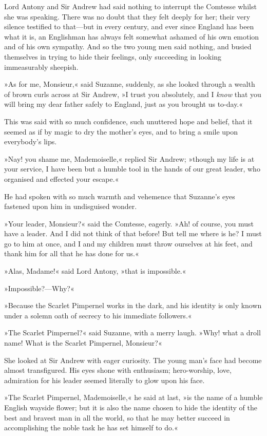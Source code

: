 Lord Antony and Sir Andrew had said nothing to interrupt the Comtesse whilst she was speaking. There was no doubt that they felt deeply for her; their very silence testified to that\allowbreak---\allowbreak but in every century, and ever since England has been what it is, an Englishman has always felt somewhat ashamed of his own emotion and of his own sympathy. And so the two young men said nothing, and busied themselves in trying to hide their feelings, only succeeding in looking immeasurably sheepish.

»As for me, Monsieur,« said Suzanne, suddenly, as she looked through a wealth of brown curls across at Sir Andrew, »I trust you absolutely, and I \textit{know} that you will bring my dear father safely to England, just as you brought us to-day.«

This was said with so much confidence, such unuttered hope and belief, that it seemed as if by magic to dry the mother's eyes, and to bring a smile upon everybody's lips.

»Nay! you shame me, Mademoiselle,« replied Sir Andrew; »though my life is at your service, I have been but a humble tool in the hands of our great leader, who organised and effected your escape.«

He had spoken with so much warmth and vehemence that Suzanne's eyes fastened upon him in undisguised wonder.

»Your leader, Monsieur?« said the Comtesse, eagerly. »Ah! of course, you must have a leader. And I did not think of that before! But tell me where is he? I must go to him at once, and I and my children must throw ourselves at his feet, and thank him for all that he has done for us.«

»Alas, Madame!« said Lord Antony, »that is impossible.«

»Impossible?\allowbreak---\allowbreak Why?«

»Because the Scarlet Pimpernel works in the dark, and his identity is only known under a solemn oath of secrecy to his immediate followers.«

»The Scarlet Pimpernel?« said Suzanne, with a merry laugh. »Why! what a droll name! What is the Scarlet Pimpernel, Monsieur?«

She looked at Sir Andrew with eager curiosity. The young man's face had become almost transfigured. His eyes shone with enthusiasm; hero-worship, love, admiration for his leader seemed literally to glow upon his face.

»The Scarlet Pimpernel, Mademoiselle,« he said at last, »is the name of a humble English wayside flower; but it is also the name chosen to hide the identity of the best and bravest man in all the world, so that he may better succeed in accomplishing the noble task he has set himself to do.«

